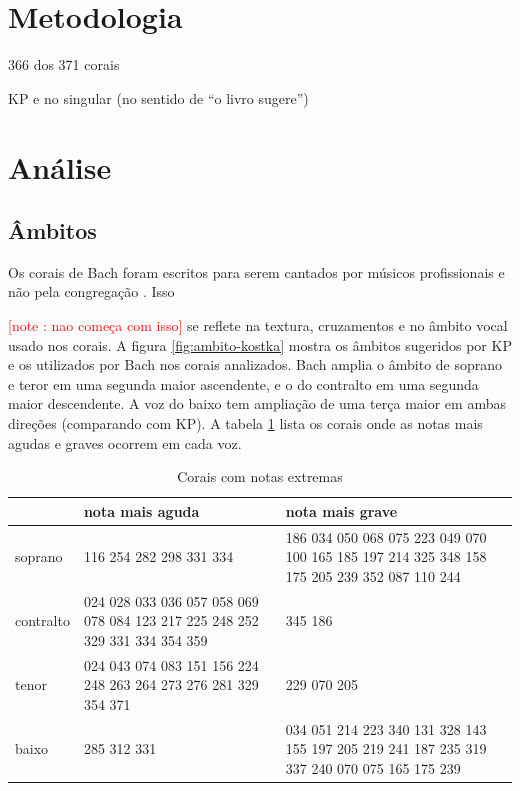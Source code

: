 \documentclass{article}
\newcounter{notecounter}
\newcommand{\note}[1]{
  \addtocounter{notecounter}{1}
  \textcolor{red}{[note \arabic{notecounter}: #1]}
}
\begin{document}
\section{Metodologia}
\label{sec:metodologia}

366 dos 371 corais

KP e no singular (no sentido de ``o livro sugere'')

\section{Análise}
\label{sec:analise}

\subsection{Âmbitos}
\label{sec:ambitos}

Os corais de Bach foram escritos para serem cantados por músicos
profissionais e não pela congregação \cite{bach41:371}. Isso \note{nao
  começa com isso} se reflete na textura, cruzamentos e no âmbito
vocal usado nos corais. A figura \ref{fig:ambito-kostka} mostra os
âmbitos sugeridos por KP e os utilizados por Bach nos corais
analizados. Bach amplia o âmbito de soprano e teror em uma segunda
maior ascendente, e o do contralto em uma segunda maior descendente. A
voz do baixo tem ampliação de uma terça maior em ambas direções
(comparando com KP). A tabela \ref{tab:notas-extremas} lista os corais
onde as notas mais agudas e graves ocorrem em cada voz.

\begin{table}
  \centering
  \begin{tabular}{l|p{4cm}p{4cm}}
    & nota mais aguda & nota mais grave \\
    \hline
    soprano & 116 254 282 298 331 334 & 186 034 050 068 075 223 049 070 100 165 185 197 214 325 348 158 175
    205 239 352 087 110 244 \\
    contralto & 024 028 033 036 057 058 069 078 084 123 217 225 248 252 329 331 334
    354 359 & 345 186 \\
    tenor & 024 043 074 083 151 156 224 248 263 264 273 276 281 329
    354 371 & 229 070 205 \\
    baixo & 285 312 331 & 034 051 214 223 340 131 328 143 155 197 205 219 241 187 235 319 337
    240 070 075 165 175 239 \\
  \end{tabular}
  \caption{Corais com notas extremas}
  \label{tab:notas-extremas}
\end{table}
\end{document}
